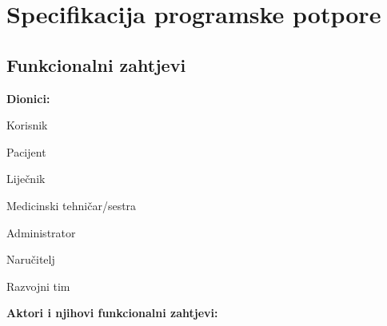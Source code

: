 \chapter{Specifikacija programske potpore}
		
	\section{Funkcionalni zahtjevi}
			
			\noindent \textbf{Dionici:}
			
			\begin{packed_enum}
				
				\item Korisnik
				    \begin{packed_item}
				    \item Pacijent
				    \item Liječnik
				    \item Medicinski tehničar/sestra
				    \end{packed_item}
				\item Administrator
				\item Naručitelj
				\item Razvojni tim
			\end{packed_enum}
			
			\noindent \textbf{Aktori i njihovi funkcionalni zahtjevi:}
			
